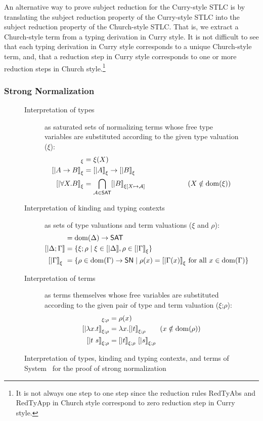 An alternative way to prove subject reduction for the Curry-style STLC is
by translating the subject reduction property of the Curry-style STLC into
the subject reduction property of the Church-style STLC. That is, we extract
a Church-style term from a typing derivation in Curry style. It is not
difficult to see that each typing derivation in Curry style corresponds to
a unique Church-style term, and, that a reduction step in Curry style
corresponds to one or more reduction steps in Church style.\footnote{
It is not always one step to one step since the reduction rules
{\sc RedTyAbs} and {\sc RedTyApp} in Church style correspond to
zero reduction step in Curry style.}

\subsubsection*{Strong Normalization}
\begin{figure}
\begin{singlespace}
\begin{description}
\item[Interpretation of types] as saturated sets of normalizing terms
	whose free type variables are substituted according to
	the given type valuation ($\xi$):
\begin{align*}
[| X |]_\xi           &= \xi(X) \\ 
[| A -> B |]_\xi      &= [|A|]_\xi -> [|B|]_\xi \\
[| \forall X.B |]_\xi &= \bigcap_{\mathcal{A}\in\SAT} [|B|]_{\xi[X\mapsto\mathcal{A}]} \qquad\qquad\qquad (X\notin\dom(\xi))
\end{align*}
\item[Interpretation of kinding and typing contexts]
       as sets of type valuations and term valuations ($\xi$ and $\rho$):
\begin{align*}
[| \Delta        |] &= \dom(\Delta) -> \SAT \\
[| \Delta;\Gamma |] &= \{ \xi;\rho \mid \xi\in[|\Delta|], \rho\in[|\Gamma|]_\xi \} \\
[| \Gamma        |]_\xi\ &= \{ \rho \in \dom(\Gamma) -> \SN \mid \rho(x)=[|\Gamma(x)|]_\xi ~\text{for all}~x\in\dom(\Gamma) \}
\end{align*}
\item[Interpretation of terms]
	as terms themselves whose free variables are substituted according to
	the given pair of type and term valuation ($\xi$;$\rho$):
\begin{align*}
[| x      |]_{\xi;\rho} &= \rho(x) \\
[| \l x.t |]_{\xi;\rho} &= \l x . [|t|]_{\xi;\rho} \qquad (x\notin\dom(\rho)) \\
[| t ~ s  |]_{\xi;\rho} &= [| t |]_{\xi;\rho} ~ [| s |]_{\xi;\rho}
\end{align*}
\end{description}
\caption[Interpretation of System \F\ for proving strong normalization]
	{Interpretation of types, kinding and typing contexts, and terms
		of System \F\ for the proof of strong normalization}
\label{fig:interpF}
\end{singlespace}
\end{figure}
